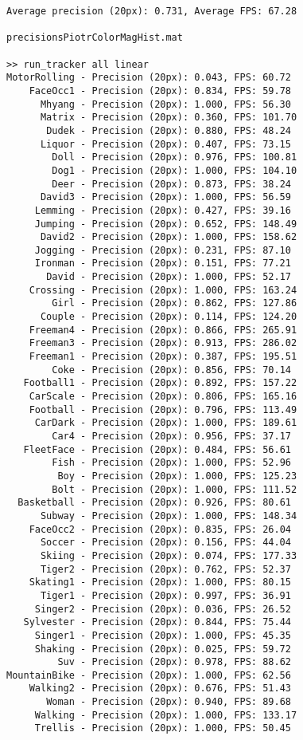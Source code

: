 \begin{lstlisting}
Average precision (20px): 0.731, Average FPS: 67.28

precisionsPiotrColorMagHist.mat

>> run_tracker all linear
MotorRolling - Precision (20px): 0.043, FPS: 60.72
    FaceOcc1 - Precision (20px): 0.834, FPS: 59.78
      Mhyang - Precision (20px): 1.000, FPS: 56.30
      Matrix - Precision (20px): 0.360, FPS: 101.70
       Dudek - Precision (20px): 0.880, FPS: 48.24
      Liquor - Precision (20px): 0.407, FPS: 73.15
        Doll - Precision (20px): 0.976, FPS: 100.81
        Dog1 - Precision (20px): 1.000, FPS: 104.10
        Deer - Precision (20px): 0.873, FPS: 38.24
      David3 - Precision (20px): 1.000, FPS: 56.59
     Lemming - Precision (20px): 0.427, FPS: 39.16
     Jumping - Precision (20px): 0.652, FPS: 148.49
      David2 - Precision (20px): 1.000, FPS: 158.62
     Jogging - Precision (20px): 0.231, FPS: 87.10
     Ironman - Precision (20px): 0.151, FPS: 77.21
       David - Precision (20px): 1.000, FPS: 52.17
    Crossing - Precision (20px): 1.000, FPS: 163.24
        Girl - Precision (20px): 0.862, FPS: 127.86
      Couple - Precision (20px): 0.114, FPS: 124.20
    Freeman4 - Precision (20px): 0.866, FPS: 265.91
    Freeman3 - Precision (20px): 0.913, FPS: 286.02
    Freeman1 - Precision (20px): 0.387, FPS: 195.51
        Coke - Precision (20px): 0.856, FPS: 70.14
   Football1 - Precision (20px): 0.892, FPS: 157.22
    CarScale - Precision (20px): 0.806, FPS: 165.16
    Football - Precision (20px): 0.796, FPS: 113.49
     CarDark - Precision (20px): 1.000, FPS: 189.61
        Car4 - Precision (20px): 0.956, FPS: 37.17
   FleetFace - Precision (20px): 0.484, FPS: 56.61
        Fish - Precision (20px): 1.000, FPS: 52.96
         Boy - Precision (20px): 1.000, FPS: 125.23
        Bolt - Precision (20px): 1.000, FPS: 111.52
  Basketball - Precision (20px): 0.926, FPS: 80.61
      Subway - Precision (20px): 1.000, FPS: 148.34
    FaceOcc2 - Precision (20px): 0.835, FPS: 26.04
      Soccer - Precision (20px): 0.156, FPS: 44.04
      Skiing - Precision (20px): 0.074, FPS: 177.33
      Tiger2 - Precision (20px): 0.762, FPS: 52.37
    Skating1 - Precision (20px): 1.000, FPS: 80.15
      Tiger1 - Precision (20px): 0.997, FPS: 36.91
     Singer2 - Precision (20px): 0.036, FPS: 26.52
   Sylvester - Precision (20px): 0.844, FPS: 75.44
     Singer1 - Precision (20px): 1.000, FPS: 45.35
     Shaking - Precision (20px): 0.025, FPS: 59.72
         Suv - Precision (20px): 0.978, FPS: 88.62
MountainBike - Precision (20px): 1.000, FPS: 62.56
    Walking2 - Precision (20px): 0.676, FPS: 51.43
       Woman - Precision (20px): 0.940, FPS: 89.68
     Walking - Precision (20px): 1.000, FPS: 133.17
     Trellis - Precision (20px): 1.000, FPS: 50.45


\end{lstlisting}

